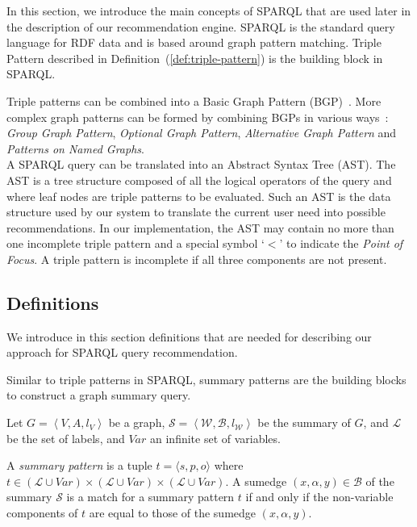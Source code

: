 In this section, we introduce the main concepts of SPARQL that are used later in the description of our recommendation engine. SPARQL is the standard query language for RDF data and is based around graph pattern matching. Triple Pattern described in Definition~(\ref{def:triple-pattern}) is the building block in SPARQL.

Triple patterns can be combined into a Basic Graph Pattern (BGP)~\cite{PrudS08}. More complex graph patterns can be formed by combining BGPs in various ways~\cite{PrudS08}: \emph{Group Graph Pattern}, \emph{Optional Graph Pattern}, \emph{Alternative Graph Pattern} and \emph{Patterns on Named Graphs}.\\

A SPARQL query can be translated into an Abstract Syntax Tree (AST). The AST is a tree structure composed of all the logical operators of the query and where leaf nodes are triple patterns to be evaluated. Such an AST is the data structure used by our system to translate the current user need into possible recommendations. In our implementation, the AST may contain no more than one incomplete triple pattern and a special symbol `$<$' to indicate the \emph{Point of Focus}. A triple pattern is incomplete if all three components are not present.

\subsection{Definitions}

We introduce in this section definitions that are needed for describing our approach for SPARQL query recommendation.

Similar to triple patterns in SPARQL, summary patterns are the building blocks to construct a graph summary query.

\begin{definition}
	Let $G=\left\langle V, A, l_V \right\rangle$ be a graph, $\mathcal{S} = \left\langle \mathcal{W}, \mathcal{B}, l_{\mathcal{W}} \right\rangle$ be the summary of $G$, and $\mathcal{L}$ be the set of labels, and $Var$ an infinite set of variables.

	A \emph{summary pattern} is a tuple $t = \langle s, p, o \rangle$ where $t \in (\mathcal{L} \cup Var) \times (\mathcal{L} \cup Var) \times (\mathcal{L} \cup Var)$.
	A sumedge $(x,\alpha,y) \in \mathcal{B}$ of the summary $\mathcal{S}$ is a match for a summary pattern $t$ if and only if the non-variable components of $t$ are equal to those of the sumedge $(x, \alpha, y)$.
	\label{def:summary-triple-pattern}
\end{definition}

